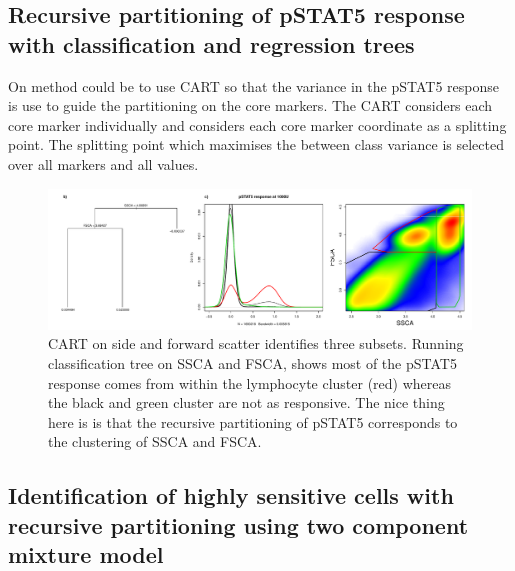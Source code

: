 \subsection{Recursive partitioning of pSTAT5 response with classification and regression trees} 

On method could be to use \gls{CART} so that the variance in the pSTAT5 response is use to guide the partitioning on the core markers.
The \gls{CART} considers each core marker individually and considers each core marker coordinate as a splitting point.
The splitting point which maximises the between class variance is selected over all markers and all values.


\begin{figure}[h]
\centering
\includegraphics[scale=.45]{IL2/figures/pstat5-response-decision-tree.pdf}
{ \gls{CART} on side and forward scatter identifies three subsets. }
{
Running classification tree on SSCA and FSCA, shows most of the pSTAT5 response comes from within the lymphocyte cluster (red) whereas
the black and green cluster are not as responsive.
The nice thing here is is that the recursive partitioning of pSTAT5 corresponds to the clustering of SSCA and FSCA.
}
\end{figure}


\subsection{Identification of highly sensitive cells with recursive partitioning using two component mixture model}

